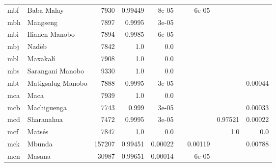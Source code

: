 \documentclass[11pt]{article}
\begin{document}
\begin{table*}[h]
{\begin{tabular}{llrrrrrrr}
mbf         & Baba Malay         & 7930         & 0.99449         & 8e-05         &          & 6e-05         &          &          \\

mbh         & Mangseng         & 7897         & 0.9995         & 3e-05         &          &          &          &          \\

mbi         & Ilianen Manobo         & 7894         & 0.9985         & 6e-05         &          &          &          &          \\

mbj         & Nadëb         & 7842         & 1.0         & 0.0         &          &          &          &          \\

mbl         & Maxakalí         & 7908         & 1.0         & 0.0         &          &          &          &          \\

mbs         & Sarangani Manobo         & 9330         & 1.0         & 0.0         &          &          &          &          \\

mbt         & Matigsalug Manobo         & 7888         & 0.9995         & 3e-05         &          &          &          & 0.00044         \\

mca         & Maca         & 7939         & 1.0         & 0.0         &          &          &          &          \\

mcb         & Machiguenga         & 7743         & 0.999         & 3e-05         &          &          &          & 0.00033         \\

mcd         & Sharanahua         & 7472         & 0.9995         & 3e-05         &          &          & 0.97521         & 0.00022         \\

mcf         & Matsés         & 7847         & 1.0         & 0.0         &          &          & 1.0         & 0.0         \\

mck         & Mbunda         & 157207         & 0.99451         & 0.00022         &          & 0.00119         &          & 0.00788         \\

mcn         & Masana         & 30987         & 0.99651         & 0.00014         &          & 6e-05         &          &          \\


\end{tabular}}
\end{table*}
\end{document}
